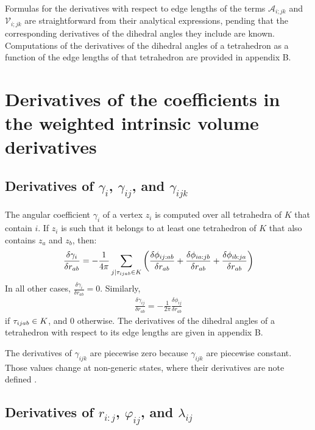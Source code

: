 \documentclass[11 pt]{article}
\newcommand {\mm}[1] {\ifmmode{#1}\else{\mbox{\(#1\)}}\fi}
\theoremstyle{plain} \theorembodyfont{\rmfamily}
\newcommand{\tsx}           {\mm{\tau}}
\begin{document}
 Formulas for the derivatives with respect to edge lengths of the terms $\mathcal{A}_{i;jk}$ and $\mathcal{V}_{i;jk}$ are straightforward from their analytical expressions, pending that the corresponding derivatives of the dihedral angles they include are known. Computations of the derivatives of the dihedral angles of a tetrahedron as a function of the edge lengths of that tetrahedron are provided in appendix B.

\section{Derivatives of the coefficients in the weighted intrinsic volume derivatives}
\label{sec:others}

 \subsection{Derivatives of $\gamma_{i}$, $\gamma_{ij}$, and $\gamma_{ijk}$}
 
 The angular coefficient $\gamma_i$ of a vertex $z_i$ is computed over all tetrahedra of $K$ that contain $i$.
If $z_i$ is such that it belongs to at least one tetrahedron of $K$ that also contains $z_a$ and $z_b$, then:
\begin{eqnarray}
 \frac{\delta \gamma_{i}}{\delta r_{ab}} = - \frac{1}{4\pi}   \sum_{j \mid \tsx_{ijab} \in K} 
 \left(  \frac{\delta \phi_{ij:ab}}{\delta r_{ab}}  + \frac{\delta \phi_{ia:jb}}{\delta r_{ab}} + \frac{\delta \phi_{ib:ja}}{\delta r_{ab}}  \right)
 \end{eqnarray}
 In all other cases, $\frac{\delta \gamma_{i}}{\delta r_{ab}} = 0$. Similarly,
 \begin{eqnarray}
\frac{\delta \gamma_{ij}} {\delta r_{ab}} = - \frac{1}{2\pi} \frac{\delta \phi_{ij}}{\delta r_{ab}}
\end{eqnarray}
 if $\tsx_{ijab} \in K$, and $0$ otherwise.
 The derivatives of the dihedral angles of a tetrahedron with respect to its edge lengths are given in appendix B.
 
The derivatives of $\gamma_{ijk}$ are piecewise zero because $\gamma_{ijk}$ are piecewise constant. Those values change at non-generic states, where their derivatives are note defined \cite{BEKL04, EdKo03, AkEd19a, AkEd19b}.
 
  \subsection{Derivatives of $r_{i:j}$, $\varphi_{ij}$, and $\lambda_{ij}$}
 
\end{document}

